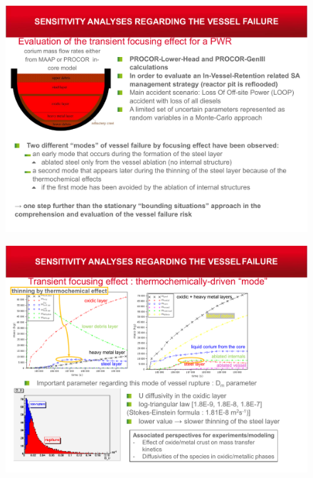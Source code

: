 \begin{frame}[fragile]
\baselineskip
\begin{figure}[H]
\centering \includegraphics[height=\textheight]{Figures/procor_1.pdf} 
\end{figure}
\end{frame}
\begin{frame}[fragile]
\baselineskip
\begin{figure}[H]
\centering \includegraphics[height=\textheight]{Figures/procor_2.pdf} 
\end{figure}
\end{frame}
